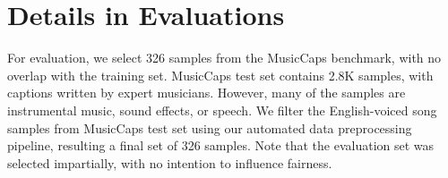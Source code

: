 \section{Details in Evaluations}
For evaluation, we select 326 samples from the MusicCaps \cite{agostinelli2023musiclm} benchmark, with no overlap with the training set. MusicCaps test set contains 2.8K samples, with captions written by expert musicians. However, many of the samples are instrumental music, sound effects, or speech. We filter the English-voiced song samples from MusicCaps test set using our automated data preprocessing pipeline, resulting a final set of 326 samples. Note that the evaluation set was selected impartially, with no intention to influence fairness.


